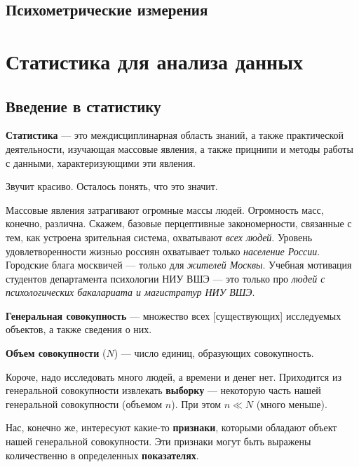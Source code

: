\documentclass[
  letterpaper,
  DIV=11,
  numbers=noendperiod]{scrreprt}
\theoremstyle{definition}
\theoremstyle{remark}
\begin{document}

\chapter{Психометрические
измерения}\label{ux43fux441ux438ux445ux43eux43cux435ux442ux440ux438ux447ux435ux441ux43aux438ux435-ux438ux437ux43cux435ux440ux435ux43dux438ux44f}

\part{Статистика для анализа данных}


\chapter{Введение в статистику}\label{stats-intro}

\textbf{Статистика} --- это междисциплинарная область знаний, а также
практической деятельности, изучающая массовые явления, а также прицнипи
и методы работы с данными, характеризующими эти явления.

Звучит красиво. Осталось понять, что это значит.

Массовые явления затрагивают огромные массы людей. Огромность масс,
конечно, различна. Скажем, базовые перцептивные закономерности,
связанные с тем, как устроена зрительная система, охватывают \emph{всех
людей}. Уровень удовлетворенности жизнью россиян охватывает только
\emph{население России}. Городские блага москвичей --- только для
\emph{жителей Москвы}. Учебная мотивация студентов департамента
психологии НИУ ВШЭ --- это только про \emph{людей с психологических
бакалариата и магистратур НИУ ВШЭ}.

\textbf{Генеральная совокупность} --- множество всех {[}существующих{]}
исследуемых объектов, а также сведения о них.

\textbf{Объем совокупности} (\(N\)) --- число единиц, образующих
совокупность.

Короче, надо исследовать много людей, а времени и денег нет. Приходится
из генеральной совокупности извлекать \textbf{выборку} --- некоторую
часть нашей генеральной совокупности (объемом \(n\)). При этом
\(n \ll N\) (много меньше).

Нас, конечно же, интересуют какие-то \textbf{признаки}, которыми
обладают объект нашей генеральной совокупности. Эти признаки могут быть
выражены количественно в определенных \textbf{показателях}.
\end{document}
